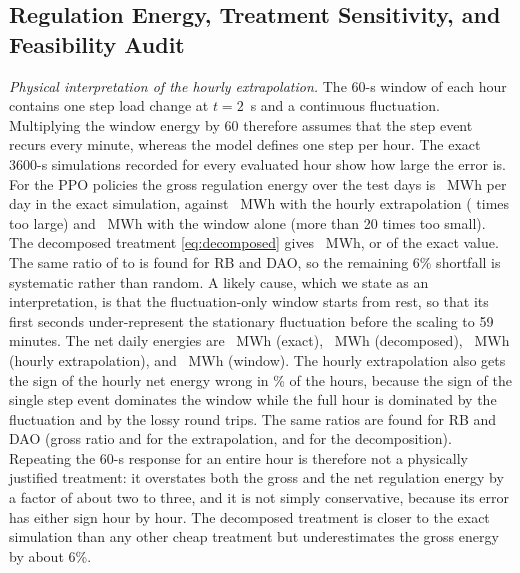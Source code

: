 

\subsection{Regulation Energy, Treatment Sensitivity, and Feasibility Audit}
\label{sec:regenergy}

\emph{Physical interpretation of the hourly extrapolation.} The 60-s
window of each hour contains one step load change at $t=2$~s and a
continuous fluctuation. Multiplying the window energy by 60 therefore
assumes that the step event recurs every minute, whereas the model
defines one step per hour. The exact 3600-s simulations recorded for
every evaluated hour show how large the error is. For the PPO
policies the gross regulation energy over the test days is
\TrkPPOGrossFull~MWh per day in the exact simulation, against
\TrkPPOGrossHour~MWh with the hourly extrapolation
(\TrkPPOGrossHourRatio{} times too large) and \TrkPPOGrossWin~MWh with
the window alone (more than 20 times too small). The decomposed
treatment \eqref{eq:decomposed} gives \TrkPPOGrossDec~MWh, or
\TrkPPOGrossDecRatio{} of the exact value. The same ratio of
\TrkRBGrossDecRatio{} to \TrkDAOGrossDecRatio{} is found for RB and
DAO, so the remaining 6\% shortfall is systematic rather than random.
A likely cause, which we state as an interpretation, is that the
fluctuation-only window starts from rest, so that its first seconds
under-represent the stationary fluctuation before the scaling to 59
minutes. The net daily energies are
\TrkPPONetFull~MWh (exact), \TrkPPONetDec~MWh (decomposed),
\TrkPPONetHour~MWh (hourly extrapolation), and \TrkPPONetWin~MWh
(window). The hourly extrapolation also gets the sign of the hourly
net energy wrong in \TrkPPOSignFlipPct\% of the hours, because the sign
of the single step event dominates the window while the full hour is
dominated by the fluctuation and by the lossy round trips. The same
ratios are found for RB and DAO (gross ratio \TrkRBGrossHourRatio{} and
\TrkDAOGrossHourRatio{} for the extrapolation, \TrkRBGrossDecRatio{}
and \TrkDAOGrossDecRatio{} for the decomposition). Repeating the 60-s
response for an entire hour is therefore not a physically justified
treatment: it overstates both the gross and the net regulation energy
by a factor of about two to three, and it is not simply conservative,
because its error has either sign hour by hour. The decomposed
treatment is closer to the exact simulation than any other cheap
treatment but underestimates the gross energy by about 6\%.

